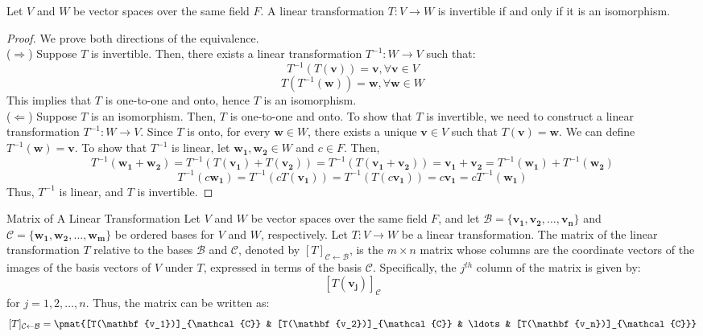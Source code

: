 \documentclass[openany]{book}
\begin{document}
\begin{mytheorem}
    Let $V$ and $W$ be vector spaces over the same field $F$. A linear transformation $T: V \to W$ is invertible if and only if it is an isomorphism.
\end{mytheorem}
\begin{proof}
    We prove both directions of the equivalence. \\
    ($\Rightarrow$) Suppose $T$ is invertible. Then, there exists a linear transformation $T^{-1}: W \to V$ such that:
    $$T^{-1}(T(\mathbf{v})) = \mathbf{v}, \forall \mathbf{v} \in V$$
    $$T(T^{-1}(\mathbf{w})) = \mathbf{w}, \forall \mathbf{w} \in W$$
    This implies that $T$ is one-to-one and onto, hence $T$ is an isomorphism. \\ 
    ($\Leftarrow$) Suppose $T$ is an isomorphism. Then, $T$ is one-to-one and onto. To show that $T$ is invertible, we need to construct a linear transformation $T^{-1}: W \to V$. Since $T$ is onto, for every $\mathbf{w} \in W$, there exists a unique $\mathbf{v} \in V$ such that $T(\mathbf{v}) = \mathbf{w}$. We can define $T^{-1}(\mathbf{w}) = \mathbf{v}$. To show that $T^{-1}$ is linear, let $\mathbf{w_1}, \mathbf{w_2} \in W$ and $c \in F$. Then,
    \[T^{-1}(\mathbf{w_1} + \mathbf{w_2}) = T^{-1}(T(\mathbf{v_1}) + T(\mathbf{v_2})) = T^{-1}(T(\mathbf{v_1} + \mathbf{v_2})) = \mathbf{v_1} + \mathbf{v_2} = T^{-1}(\mathbf{w_1}) + T^{-1}(\mathbf{w_2})\]
    \[T^{-1}(c\mathbf{w_1}) = T^{-1}(cT(\mathbf{v_1})) = T^{-1}(T(c\mathbf{v_1})) = c\mathbf{v_1} = cT^{-1}(\mathbf{w_1})\]
    Thus, $T^{-1}$ is linear, and $T$ is invertible.
\end{proof}
\begin{mydefinition}{Matrix of A Linear Transformation}
    Let $V$ and $W$ be vector spaces over the same field $F$, and let $\mathcal{B} = \{\mathbf{v_1}, \mathbf{v_2}, \ldots, \mathbf{v_n}\}$ and $\mathcal{C} = \{\mathbf{w_1}, \mathbf{w_2}, \ldots, \mathbf{w_m}\}$ be ordered bases for $V$ and $W$, respectively. Let $T: V \to W$ be a linear transformation. The matrix of the linear transformation $T$ relative to the bases $\mathcal{B}$ and $\mathcal{C}$, denoted by $[T]_{\mathcal{C} \leftarrow \mathcal{B}}$, is the $m \times n$ matrix whose columns are the coordinate vectors of the images of the basis vectors of $V$ under $T$, expressed in terms of the basis $\mathcal{C}$. Specifically, the $j^{th}$ column of the matrix is given by:
    $$[T(\mathbf{v_j})]_{\mathcal{C}}$$
    for $j = 1, 2, \ldots, n$. Thus, the matrix can be written as:
    $$[T]_{\mathcal{C} \leftarrow \mathcal{B}} = \pmat{[T(\mathbf{v_1})]_{\mathcal{C}} & [T(\mathbf{v_2})]_{\mathcal{C}} & \ldots & [T(\mathbf{v_n})]_{\mathcal{C}}}$$
\end{mydefinition}
\end{document}
